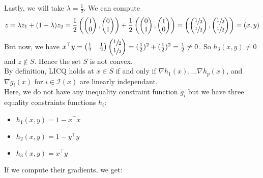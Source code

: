 \documentclass{article}
\newcommand{\tp}{^\top}
\begin{document}
Lastly, we will take $\lambda=\frac{1}{2}$. We can compute 
$$
z=\lambda z_1 + (1-\lambda) z_2
=\frac{1}{2}
\left(
	\begin{pmatrix} 1\\ 0\end{pmatrix},
	\begin{pmatrix} 0\\ 1\end{pmatrix}
\right)
+\frac{1}{2}
\left(
	\begin{pmatrix} 0\\ 1\end{pmatrix},
	\begin{pmatrix} 1\\ 0\end{pmatrix}
\right)
=
\left(
	\begin{pmatrix} \sfrac{1}{2}\\ \sfrac{1}{2}\end{pmatrix},
	\begin{pmatrix} \sfrac{1}{2}\\ \sfrac{1}{2}\end{pmatrix}
\right)
=(x,y)$$
But now, we have $x\tp y=
\begin{pmatrix} \frac{1}{2}& \frac{1}{2}\end{pmatrix}
\begin{pmatrix} \sfrac{1}{2}\\ \sfrac{1}{2}\end{pmatrix}
=(\frac{1}{2})^2+(\frac{1}{2})^2=\frac{1}{2} \neq 0$. So $h_3(x,y)\neq 0$ and $z\notin S$. Hence the set $S$ is not convex.\\

By definition, LICQ holds at $x\in S$ if and only if $\nabla h_1(x),\dots\nabla h_p(x)$, and $\nabla g_i(x)$ for $i\in \mathcal I(x) $ are linearly independant.\\
Here, we do not have any inequality constraint function $g_i$ but we have three equality constraints functions $h_i$:
\begin{itemize}
\item  $h_1(x,y)=1-x\tp x$
\item $h_2(x,y)=1-y\tp y$
\item $h_3(x,y)= x\tp y$
\end{itemize} 
If we compute their gradients, we get:
\end{document}
